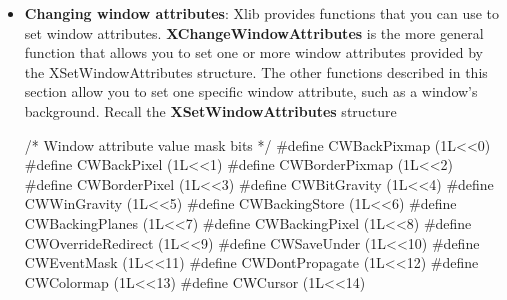 \documentclass{report}
\begin{document}
\begin{itemize}
            The \textbf{XRestackWindows} function restacks the windows in the order specified, from top to bottom. The stacking order of the first window in the windows array is unaffected, but the other windows in the array are stacked underneath the first window, in the order of the array. The stacking order of the other windows is not affected. For each window in the window array that is not a child of the specified window, a \textbf{BadMatch} error results.
            \bigbreak \noindent 
            If the override-redirect attribute of a window is False and some other client has selected \textbf{SubstructureRedirectMask} on the parent, the X server generates \textbf{ConfigureRequest} events for each window whose override-redirect flag is not set, and no further processing is performed. Otherwise, the windows will be restacked in top-to-bottom order.
            \bigbreak \noindent 
            \textbf{XRestackWindows} can generate a \textbf{BadWindow} error.
            \bigbreak \noindent 
        \item \textbf{Changing window attributes}: Xlib provides functions that you can use to set window attributes. \textbf{XChangeWindowAttributes} is the more general function that allows you to set one or more window attributes provided by the XSetWindowAttributes structure. The other functions described in this section allow you to set one specific window attribute, such as a window’s background.
            \bigbreak \noindent 
            Recall the \textbf{XSetWindowAttributes} structure
            \bigbreak \noindent 
            \begin{cppcode}
                /* Window attribute value mask bits */
                #define CWBackPixmap        (1L<<0)
                #define CWBackPixel         (1L<<1)
                #define CWBorderPixmap      (1L<<2)
                #define CWBorderPixel       (1L<<3)
                #define CWBitGravity        (1L<<4)
                #define CWWinGravity        (1L<<5)
                #define CWBackingStore      (1L<<6)
                #define CWBackingPlanes     (1L<<7)
                #define CWBackingPixel      (1L<<8)
                #define CWOverrideRedirect  (1L<<9)
                #define CWSaveUnder         (1L<<10)
                #define CWEventMask         (1L<<11)
                #define CWDontPropagate     (1L<<12)
                #define CWColormap          (1L<<13)
                #define CWCursor            (1L<<14)


\end{cppcode}
\end{itemize}
\end{document}
